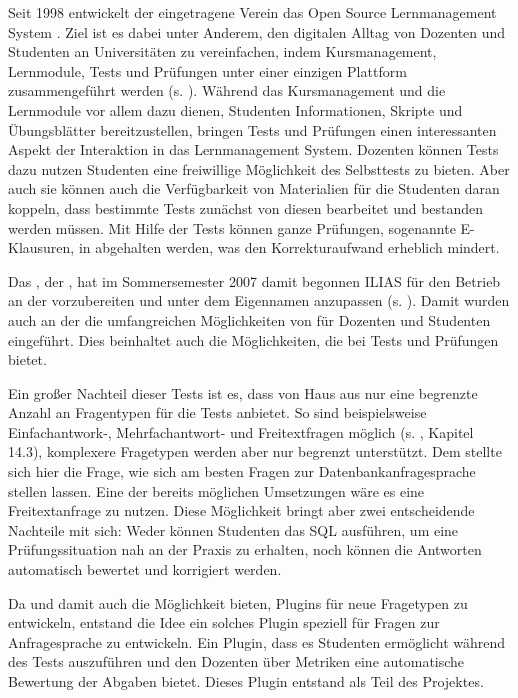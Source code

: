 Seit 1998 entwickelt der eingetragene Verein  das Open Source Lernmanagement System . Ziel ist es dabei unter Anderem, den digitalen Alltag von Dozenten und Studenten an Universitäten zu vereinfachen, indem Kursmanagement, Lernmodule, Tests und Prüfungen unter einer einzigen Plattform zusammengeführt werden (s. \cite{Ilias1998}). Während das Kursmanagement und die Lernmodule vor allem dazu dienen, Studenten Informationen, Skripte und Übungsblätter bereitzustellen, bringen Tests und Prüfungen einen interessanten Aspekt der Interaktion in das Lernmanagement System. Dozenten können Tests dazu nutzen Studenten eine freiwillige Möglichkeit des Selbsttests zu bieten. Aber auch sie können auch die Verfügbarkeit von Materialien für die Studenten daran koppeln, dass bestimmte Tests zunächst von diesen bearbeitet und bestanden werden müssen. Mit Hilfe der Tests können ganze Prüfungen, sogenannte E-Klausuren, in  abgehalten werden, was den Korrekturaufwand erheblich mindert.

Das  , der  , hat im Sommersemester 2007 damit begonnen ILIAS für den Betrieb an der  vorzubereiten und unter dem Eigennamen  anzupassen (s. \cite{Studon2007}). Damit wurden auch an der  die umfangreichen Möglichkeiten von  für Dozenten und Studenten eingeführt. Dies beinhaltet auch die Möglichkeiten, die  bei Tests und Prüfungen bietet. 

Ein großer Nachteil dieser Tests ist es, dass  von Haus aus nur eine begrenzte Anzahl an Fragentypen für die Tests anbietet. So sind beispielsweise Einfachantwork-, Mehrfachantwort- und Freitextfragen möglich (s. \cite{IliasAutorenDokumentation}, Kapitel 14.3), komplexere Fragetypen werden aber nur begrenzt unterstützt. Dem  stellte sich hier die Frage, wie sich am besten Fragen zur Datenbankanfragesprache  stellen lassen. Eine der bereits möglichen Umsetzungen wäre es eine Freitextanfrage zu nutzen. Diese Möglichkeit bringt aber zwei entscheidende Nachteile mit sich: Weder können Studenten das SQL ausführen, um eine Prüfungssituation nah an der Praxis zu erhalten, noch können die Antworten automatisch bewertet und korrigiert werden.

Da  und damit auch  die Möglichkeit bieten, Plugins für neue Fragetypen zu entwickeln, entstand die Idee ein solches Plugin speziell für Fragen zur Anfragesprache  zu entwickeln. Ein Plugin, dass es Studenten ermöglicht  während des Tests auszuführen und den Dozenten über Metriken eine automatische Bewertung der Abgaben bietet. Dieses Plugin entstand als Teil des  Projektes.